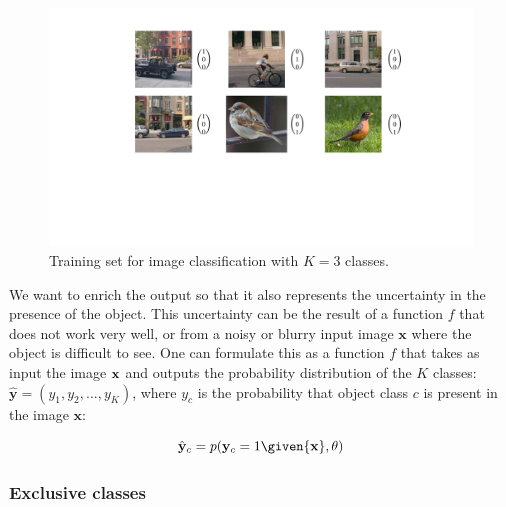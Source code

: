 \begin{figure}
\centerline{
\includegraphics[width=1\linewidth]{figures/object_recognition/classification_training_set.pdf}
}
\caption{Training set for image classification with $K=3$ classes.}
\label{fig:classification_training_set}
\end{figure}

We want to enrich the output so that it also represents the uncertainty in the presence of the object. This uncertainty can be the result of a function $f$ that does not work very well, or from a noisy or blurry input image $\mathbf{x}$ where the object is difficult to see. One can formulate this as a function $f$ that takes as input the image ${\bf x}$ and outputs the probability distribution of the $K$ classes: $\hat{\mathbf{y}}=(y_1, y_2, ..., y_K)$, where $y_c$ is the probability that object class $c$ is present in the image $\mathbf{x}$:

\begin{equation}
\hat {\bf y}_c = p({\bf y}_c=1 \given {\bf x}, \theta) 
\end{equation}

\subsubsection{Exclusive classes}

